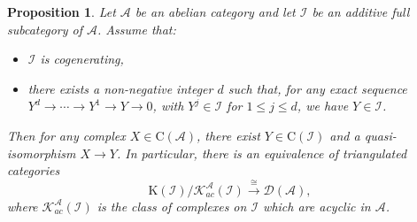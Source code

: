 \documentclass{proc-l}
\newtheorem{proposition}[theorem]{Proposition}
\theoremstyle{definition}
\theoremstyle{remark}
\numberwithin{equation}{section}
\begin{document}
\begin{proposition}\cite[Proposition~13.2.6]{KaSc}\label{ks2}
Let $\mathcal{A}$ be an abelian category and let $\mathcal I$ be an additive full subcategory of $\mathcal A$. Assume that:
\begin{itemize}
\item[\rm (i)]$\mathcal I$ is cogenerating,
\item[\rm (ii)]there exists a non-negative integer $d$ such that, for any exact sequence $Y^d \to \cdots \to Y^1\to Y \to 0$, with 
$Y^j \in \mathcal I$ for $1 \leq j\leq d$, we have $Y\in \mathcal I$.
\end{itemize}
Then for any complex $X \in \text{C}(\mathcal A)$, there exist $Y \in \text{C}(\mathcal I)$ and a quasi-isomorphism $X \to Y$. In particular, there is an equivalence of triangulated categories 
\[
\text{K}(\mathcal I)/\mathcal{K}_{ac}^{\mathcal{A}}(\mathcal I) \stackrel{\cong}\to \mathcal{D}(\mathcal A),
\]
where $\mathcal{K}_{ac}^{\mathcal{A}}(\mathcal I)$ is the class of complexes on $\mathcal I$ which are acyclic in $\mathcal A$.
\end{proposition}
\end{document}
